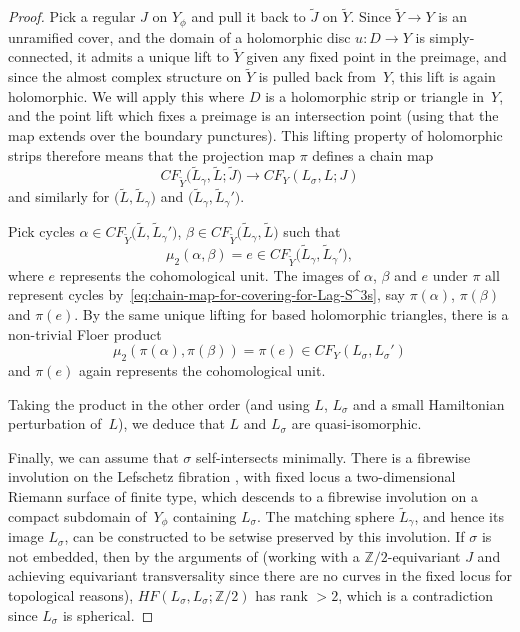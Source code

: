 \documentclass[pdftex]{sigma}
\def\bZ{\mathbb{Z}}
\theoremstyle{definition}
\numberwithin{equation}{section}
\begin{document}
\begin{proof}
Pick a regular $J$ on $ Y_{\phi}$ and pull it back to $\tilde{J}$ on $\tilde{Y}$. Since $\tilde{Y} \to Y$ is an unramified cover, and the domain of a holomorphic disc $u\colon D \to Y$ is simply-connected, it admits a unique lift to $\tilde{Y}$ given any fixed point in the preimage, and since the almost complex structure on $\tilde{Y}$ is pulled back from~$Y$, this lift is again holomorphic. We will apply this where $D$ is a holomorphic strip or triangle in~$Y$, and the point lift which fixes a preimage is an intersection point (using that the map extends over the boundary punctures). This lifting property of holomorphic strips therefore means that the projection map $\pi$ defines a chain map
\begin{equation} \label{eq:chain-map-for-covering-for-Lag-S^3s}
 {CF}_{\tilde{Y}} \bigl(\tilde{L}_\gamma, \tilde{L}; \tilde{J}\bigr) \to {CF}_Y (L_\sigma, L; J)
\end{equation}
and similarly for $\bigl(\tilde{L}, \tilde{L}_\gamma\bigr) $ and $\bigl(\tilde{L}_\gamma, \tilde{L}_\gamma'\bigr)$.

Pick cycles $\alpha \in {CF}_{\tilde{Y}} \bigl(\tilde{L}, \tilde{L}_\gamma' \bigr) $, $\beta \in {CF}_{\tilde{Y}} \bigl(\tilde{L}_\gamma, \tilde{L}\bigr) $ such that
\begin{equation*}
 \mu_2 (\alpha, \beta) = e \in {CF}_{\tilde{Y}} \bigl(\tilde{L}_\gamma, \tilde{L}_\gamma'\bigr),
\end{equation*}
where $e$ represents the cohomological unit. The images of $\alpha$, $\beta$ and $e$ under $\pi$ all represent cycles by~\eqref{eq:chain-map-for-covering-for-Lag-S^3s}, say $\pi(\alpha)$, $\pi(\beta)$ and $\pi(e)$. By the same unique lifting for based holomorphic triangles,
there is a non-trivial Floer product
\begin{equation*}
 \mu_2 (\pi(\alpha), \pi(\beta)) = \pi(e) \in {CF}_{Y} (L_\sigma, L_\sigma')
\end{equation*}
and $\pi(e)$ again represents the cohomological unit.

Taking the product in the other order (and using $L$, $L_\sigma$ and a small Hamiltonian perturbation of~$L$), we deduce that $L$ and $L_\sigma$ are quasi-isomorphic.

Finally, we can assume that $\sigma$ self-intersects minimally. There is a fibrewise involution on the Lefschetz fibration , with fixed locus a two-dimensional Riemann surface of finite type, which descends to a fibrewise involution on a compact subdomain of~$Y_{\phi}$ containing $L_{\sigma}$. The matching sphere $\tilde{L}_{\gamma}$, and hence its image $L_{\sigma}$, can be constructed to be setwise preserved by this involution. If $\sigma$ is not embedded, then by the arguments of \cite[Section~5]{Khovanov-Seidel} (working with a $\bZ/2$-equivariant $J$ and achieving equivariant transversality since there are no curves in the fixed locus for topological reasons), $HF(L_{\sigma},L_{\sigma};\bZ/2)$ has rank $>2$, which is a contradiction since $L_{\sigma}$ is spherical.
\end{proof}
\end{document}
